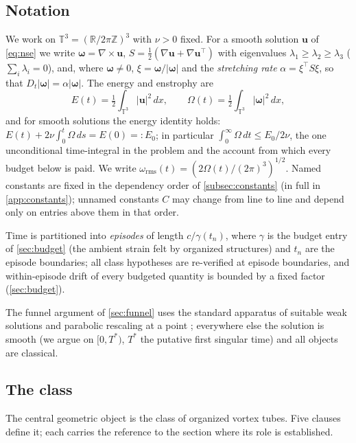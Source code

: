 \documentclass[11pt,letterpaper]{amsart}
\theoremstyle{definition}
\theoremstyle{remark}
\newcommand{\TT}{\mathbb{T}}
\newcommand{\RR}{\mathbb{R}}
\newcommand{\om}{\omega}
\newcommand{\vort}{\boldsymbol{\omega}}
\newcommand{\uu}{\boldsymbol{u}}
\newcommand{\abs}[1]{\lvert #1 \rvert}
\begin{document}
\subsection{Notation}\label{subsec:notation}
We work on $\TT^3=(\RR/2\pi\mathbb{Z})^3$ with $\nu>0$ fixed. For a smooth solution
$\uu$ of \eqref{eq:nse} we write $\vort=\nabla\times\uu$,
$S=\tfrac12(\nabla\uu+\nabla\uu^{\top})$ with eigenvalues
$\lambda_1\ge\lambda_2\ge\lambda_3$ ($\sum_i\lambda_i=0$), and, where $\vort\neq0$,
$\xi=\vort/\abs{\vort}$ and the \emph{stretching rate}
$\alpha=\xi^{\top}S\xi$, so that $D_t\abs{\vort}=\alpha\abs{\vort}$. The energy and
enstrophy are
\[
E(t)=\tfrac12\int_{\TT^3}\abs{\uu}^2\,dx,\qquad
\Omega(t)=\tfrac12\int_{\TT^3}\abs{\vort}^2\,dx,
\]
and for smooth solutions the energy identity holds:
$E(t)+2\nu\int_0^t\Omega\,ds=E(0)=:E_0$; in particular
$\int_0^\infty\Omega\,dt\le E_0/2\nu$, the one unconditional time-integral in the
problem and the account from which every budget below is paid. We write
$\om_{\mathrm{rms}}(t)=(2\Omega(t)/(2\pi)^3)^{1/2}$. Named constants are fixed in the
dependency order of \cref{subsec:constants} (in full in \cref{app:constants});
unnamed constants $C$ may change from line to line and depend only on entries above
them in that order.

Time is partitioned into \emph{episodes} of length $c/\gamma(t_n)$, where $\gamma$ is
the budget entry of \cref{sec:budget} (the ambient strain felt by organized
structures) and $t_n$ are the episode boundaries; all class hypotheses are re-verified
at episode boundaries, and within-episode drift of every budgeted quantity is bounded
by a fixed factor (\cref{sec:budget}).

The funnel argument of \cref{sec:funnel} uses the standard apparatus of suitable weak
solutions and parabolic rescaling at a point
\cite{CKN1982,Lin1998,LemarieRieusset2002,KikuchiSeregin2007}; everywhere else the
solution is smooth (we argue on $[0,T^*)$, $T^*$ the putative first singular time) and
all objects are classical.

\subsection{The class}\label{subsec:class}
The central geometric object is the class of organized vortex tubes. Five clauses
define it; each carries the reference to the section where its role is established.
\end{document}
